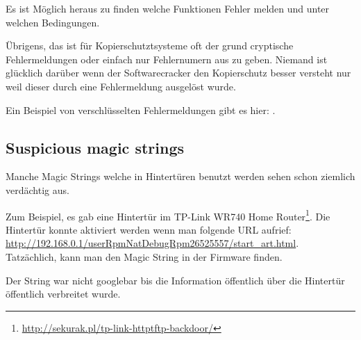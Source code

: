 Es ist Möglich heraus zu finden welche Funktionen Fehler melden und unter welchen Bedingungen.


Übrigens, das ist für Kopierschutztsysteme oft der grund cryptische Fehlermeldungen oder einfach nur 
Fehlernumern aus zu geben. Niemand ist glücklich darüber wenn der Softwarecracker den Kopierschutz besser
versteht nur weil dieser durch eine Fehlermeldung ausgelöst wurde.


Ein Beispiel von verschlüsselten Fehlermeldungen gibt es hier: .

\subsection{Suspicious magic strings}

Manche Magic Strings welche in Hintertüren benutzt werden sehen schon ziemlich verdächtig aus.


Zum Beispiel, es gab eine Hintertür im TP-Link WR740 Home Router\footnote{\url{http://sekurak.pl/tp-link-httptftp-backdoor/}}.
Die Hintertür konnte aktiviert werden wenn man folgende URL aufrief:
\url{http://192.168.0.1/userRpmNatDebugRpm26525557/start_art.html}.\\

Tatzächlich, kann man den Magic String  in der Firmware finden.

Der String war nicht googlebar bis die Information öffentlich über die Hintertür öffentlich verbreitet wurde.


